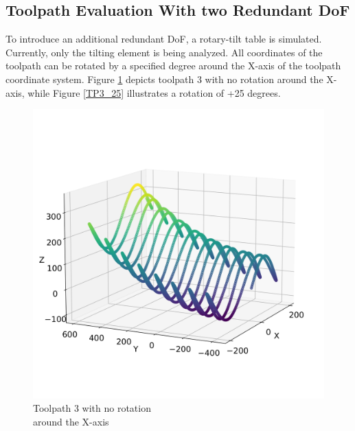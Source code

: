 \newpage
\subsection{Toolpath Evaluation With two Redundant DoF}\label{2RDOF}

To introduce an additional redundant \acrshort{DoF}, a rotary-tilt table is simulated. Currently, only the tilting element is being analyzed. All coordinates of the toolpath can be rotated by a specified degree around the X-axis of the toolpath coordinate system. Figure \ref{TP3_0} depicts toolpath 3 with no rotation around the X-axis, while Figure \ref{TP3_25} illustrates a rotation of +25 degrees.

\begin{figure}[H]%
	\centering
	\begin{minipage}{0.5\textwidth}
		\includegraphics[width=\textwidth]{figures/path3_kipp_0_comparison.png}
		\caption{Toolpath 3 with no rotation\\ around the X-axis}
		\label{TP3_0}
	\end{minipage}\hfill
	\begin{minipage}{0.5\textwidth}

\end{minipage}
\end{figure}
